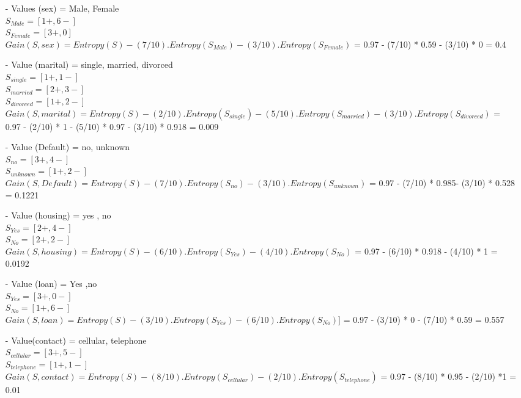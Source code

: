 \documentclass{report}
\begin{document}
   \begin{enumerate}
        \item[- ] Values (sex) = Male, Female \\
        $S_{Male} = [1+,6-]$ \\
        $S_{Female} = [3+,0]$ \\
        $Gain(S,sex) = Entropy(S) - (7/10).Entropy(S_{Male}) - (3/10). Entropy(S_{Female})$ = 0.97 - (7/10) * 0.59 - (3/10) * 0 = 0.4
        \item[- ] Value (marital) = single, married, divorced \\
        $S_{single} = [1+,1-] $ \\
        $S_{married} = [2+,3-]$ \\
        $S_{divorced} = [1+,2-]$ \\
        $Gain(S, marital) = Entropy(S) - (2/10).Entropy(S_{single}) - (5/10). Entropy(S_{married}) - (3/10).Entropy(S_{divorced})$ = 0.97 - (2/10) * 1 - (5/10) * 0.97 - (3/10) * 0.918 = 0.009
        \item[- ] Value (Default) = no, unknown \\
        $ S_{no} = [3+,4-]$\\
        $S_{unknown} = [1+,2-]$ \\
        $Gain(S, Default) = Entropy(S) - (7/10).Entropy(S_{no}) - (3/10).Entropy(S_{ unknown})$ = 0.97 - (7/10) *   0.985- (3/10) * 0.528 = 0.1221
        \item[- ] Value (housing) = yes , no\\
        $S_{Yes} = [2+,4-]$\\
        $S_{No}= [2+,2-]$ \\
        $Gain(S,housing) = Entropy(S) - (6/10).Entropy(S_{Yes}) - (4/10).Entropy(S_{No})$ = 0.97 - (6/10) * 0.918 - (4/10) *  1 = 0.0192
        \item[- ] Value (loan) = Yes ,no \\
        $S_{Yes} = [3+,0-]$\\
        $S_{No}= [1+,6-]$\\
        $Gain(S,loan) = Entropy(S) - (3/10).Entropy(S_{Yes}) - (6/10).Entropy(S_{No})]$ = 0.97 - (3/10) * 0 - (7/10) *  0.59 = 0.557 
        \item[- ] Value(contact) = cellular, telephone \\
        $S_{cellular} = [3+,5-]$ \\
        $S_{telephone} = [1+,1-]$\\
        $Gain(S, contact) = Entropy(S) - (8/10).Entropy(S_{cellular}) - (2/10). Entropy(S_{telephone})$ = 0.97 - (8/10) * 0.95  - (2/10) *1 = 0.01
    \end{enumerate}
\end{document}
